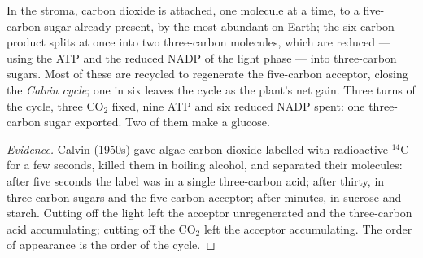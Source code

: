 \begin{proposition}\label{prop:g12:photosynthesis:calvin}
In the stroma, carbon dioxide is attached, one molecule at a time, to
a five-carbon sugar already present, by the most abundant  on
Earth; the six-carbon product splits at once into two three-carbon
molecules, which are reduced --- using the ATP and the reduced NADP of
the light phase --- into three-carbon sugars. Most of these are
recycled to regenerate the five-carbon acceptor, closing the
\emph{Calvin cycle}; one in six leaves the cycle
as the plant's net gain. Three turns of the cycle, three
$\mathrm{CO_2}$ fixed, nine ATP and six reduced NADP spent: one
three-carbon sugar exported. Two of them make a glucose.
\end{proposition}
\begin{proof}[Evidence]
Calvin (1950s) gave algae carbon dioxide labelled with radioactive
$^{14}$C for a few seconds, killed them in boiling alcohol, and
separated their molecules: after five seconds the label was in a
single three-carbon acid; after thirty, in three-carbon sugars and the
five-carbon acceptor; after minutes, in sucrose and starch. Cutting
off the light left the acceptor unregenerated and the three-carbon
acid accumulating; cutting off the $\mathrm{CO_2}$ left the acceptor
accumulating. The order of appearance is the order of the cycle.
\end{proof}


